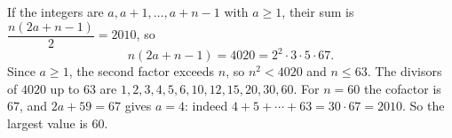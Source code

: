 If the integers are $a,a+1,\dots,a+n-1$ with $a\ge1$, their sum is $\dfrac{n(2a+n-1)}2=2010$, so
\[n(2a+n-1)=4020=2^2\cdot3\cdot5\cdot67.\]
Since $a\ge1$, the second factor exceeds $n$, so $n^2<4020$ and $n\le63$. The divisors of $4020$ up to $63$ are $1,2,3,4,5,6,10,12,15,20,30,60$. For $n=60$ the cofactor is $67$, and $2a+59=67$ gives $a=4$: indeed $4+5+\cdots+63=30\cdot67=2010$. So the largest value is $\boxed{60}$.
